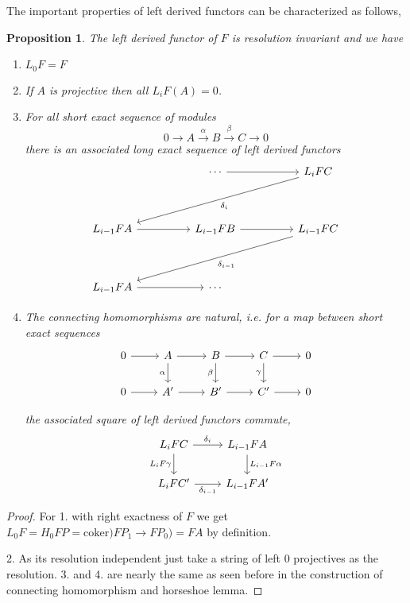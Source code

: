 \documentclass[12pt]{article}
\numberwithin{equation}{section}
\newtheorem{proposition}{Proposition}[section]
\begin{document}
	The important properties of left derived functors can be characterized as follows,
	\begin{proposition}
		The left derived functor of $F$ is resolution invariant and we have
		\begin{enumerate}
			\item $L_0F=F$
			\item If $A$ is projective then all $L_iF(A)=0$.
			\item For all short exact sequence of modules \[ 0 \to A \xrightarrow{\alpha} B \xrightarrow{\beta}  C \to 0\]there is an associated long exact sequence of left derived functors
			\[\begin{tikzcd}
				&& \cdots && {L_iFC} \\
				\\
				{L_{i-1}FA} && {L_{i-1}FB} && {L_{i-1}FC} \\
				\\
				{L_{i-1}FA} && \cdots
				\arrow[from=1-3, to=1-5]
				\arrow["{\delta_i}", from=1-5, to=3-1]
				\arrow[from=3-1, to=3-3]
				\arrow[from=3-3, to=3-5]
				\arrow["{\delta_{i-1}}", from=3-5, to=5-1]
				\arrow[from=5-1, to=5-3]
			\end{tikzcd}\]
			\item The connecting homomorphisms are natural, i.e. for a map between short exact sequences 
			\[\begin{tikzcd}
				0 & A & B & C & 0 \\
				0 & {A'} & {B'} & {C'} & 0
				\arrow[from=1-1, to=1-2]
				\arrow[from=1-2, to=1-3]
				\arrow[from=1-3, to=1-4]
				\arrow[from=1-4, to=1-5]
				\arrow[from=2-1, to=2-2]
				\arrow[from=2-2, to=2-3]
				\arrow[from=2-3, to=2-4]
				\arrow[from=2-4, to=2-5]
				\arrow["\alpha"', from=1-2, to=2-2]
				\arrow["\beta"', from=1-3, to=2-3]
				\arrow["\gamma"', from=1-4, to=2-4]
			\end{tikzcd}\]
			
			the associated square of left derived functors commute,
			\[\begin{tikzcd}
				{L_iFC} & {L_{i-1}FA} \\
				{L_iFC'} & {L_{i-1}FA'}
				\arrow["{\delta_i}", from=1-1, to=1-2]
				\arrow["{L_iF\gamma}"', from=1-1, to=2-1]
				\arrow["{\delta_{i-1}}"', from=2-1, to=2-2]
				\arrow["{L_{i-1}F\alpha}", from=1-2, to=2-2]
			\end{tikzcd}\]
		\end{enumerate}
	\end{proposition}
	\begin{proof}
		For 1. with right exactness of $F$ we get  $L_0F=H_0FP=\mathrm{coker})FP_1\to FP_0)=FA$ by definition.
		
		2. As its resolution independent just take a string of left 0 projectives as the resolution.
		3. and 4. are nearly the same as seen before in the construction of connecting  homomorphism and horseshoe lemma.
	 \end{proof}
	 
\end{document}
